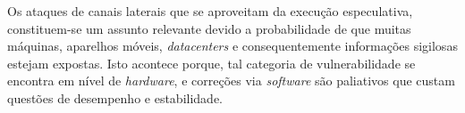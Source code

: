 \documentclass[
	article,			    %
	12pt,				    %
	oneside,			    %
	a4paper,			    %
	chapter=TITLE,		    %
	section=TITLE,		    %
	subsection=TITLE,	    %
	english,			    %
	brazil,				    %
	sumario=tradicional
]{abntex2}
\begin{document}
\begin{comment}
As outras fabricantes (\emph{AMD} e \emph{ARM Holdings}), em parceria com algumas montadoras e produtoras de \emph{softwares} também se pronunciaram em notas oficiais, assumindo ou não as falhas em seus produtos e, tomando certa medida de prevenção, formaram parcerias para lançarem correções em aplicações para usuário final (\emph{browsers} por exemplo), que previnem a exploração das falhas. Fabricantes de jogos que utilizam os processadores \emph{AMD} ou \emph{ARM}, como \emph{Sony} e \emph{Nintendo}, não se pronunciaram, conforme lista oficial publicada pela Universidade de Tecnologia de Graz \cite{meltdownspectreattack}.

Em 03 de Janeiro de 2018, pesquisadores da Universidade Católica de Leuven e do IT de Israel, das Universidades de Michigan e Adelaide e da \emph{CSIRO Data61}, fizeram novas publicações comprovativas de duas novas derivações da \emph{Spectre}. Batizadas de \emph{Foreshadow}\footnote{Prefigurar, pressupor ou prévio (``fore'', inglês). Assim como no \footnotemark[\numexpr\value{footnote}-2], o nome deriva da causa da falha.} e \emph{Foreshadow-NG}, em processadores de servidores e em máquinas virtuais \cite{vanbulck2018foreshadow}.

Em 01 de Março de 2019, pesquisadores do Instituto Politécnico de Worcester e da Universidade de Lübeck, publicaram um artigo expondo mais uma possibilidade de exploração do comportamento arquitetural dos processadores da \emph{Intel}. Chamada de \emph{Spoiler}, esta nova vulnerabilidade não é uma variação das anteriores e nenhum dos métodos de mitigação divulgados até a data desta pesquisa, suprimem esta nova forma de realizar vazamentos de informações \cite{islam2019spoiler}.

Tal assunto adquiriu grande importância na divulgação pelos veículos de comunicação, pois é provável que muitas máquinas, aparelhos móveis, \emph{datacenters} e consequentemente informações sigilosas sejam expostas e continuem sendo. Isto se dá, porque tal categoria de vulnerabilidade está em nível de \emph{hardware}, e correções via \emph{software} são paliativos que custam questões de desempenho.
\end{comment}
Os ataques de canais laterais que se aproveitam da execução especulativa, constituem-se um assunto relevante devido a probabilidade de que muitas máquinas, aparelhos móveis, \emph{datacenters} e consequentemente informações sigilosas estejam expostas. Isto acontece porque, tal categoria de vulnerabilidade se encontra em nível de \emph{hardware}, e correções via \emph{software} são paliativos que custam questões de desempenho e estabilidade. 
\end{document}
